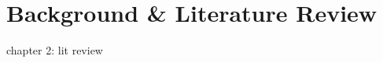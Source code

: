 \chapter[Background \& Literature Review]{Background \& Literature Review} \label{c:background} \glsresetall

chapter 2: lit review